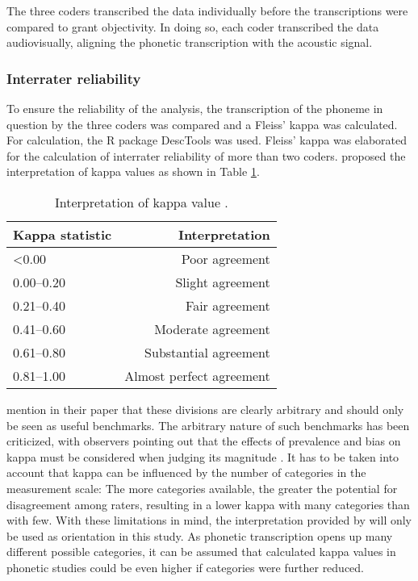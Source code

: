 \documentclass[output=paper]{langscibook}
\begin{document}
The three coders transcribed the data individually before the transcriptions were compared to grant objectivity. In doing so, each coder transcribed the data audiovisually, aligning the phonetic transcription with the acoustic signal. 

\subsubsection{Interrater reliability}
To ensure the reliability of the analysis, the transcription of the phoneme in question by the three coders was compared and a Fleiss' kappa \citep[]{Fleiss2003} was calculated. For calculation, the R package DescTools \citep[]{desc} was used. Fleiss' kappa was elaborated for the calculation of interrater reliability of more than two coders. \citet[]{Landis1977} proposed the interpretation of kappa values as shown in Table \ref{baumler:tab:fleiss}.

\begin{table}
 \begin{tabularx}{.8\textwidth}{Xr}
\midrule\toprule
            Kappa statistic  & Interpretation\\
  \midrule
  <0.00      &   Poor agreement\\
  0.00–0.20  &   Slight agreement\\
  0.21–0.40  &   Fair agreement\\
  0.41–0.60  &   Moderate agreement\\
  0.61–0.80  &   Substantial agreement\\
  0.81–1.00  &   Almost perfect agreement\\
\bottomrule\midrule
 \end{tabularx}
\caption{Interpretation of kappa value \citep[165]{Landis1977}.}
\label{baumler:tab:fleiss}
\end{table}

\citet[]{Landis1977} mention in their paper that these divisions are clearly arbitrary and should only be seen as useful benchmarks. The arbitrary nature of such benchmarks has been criticized, with observers pointing out that the effects of prevalence and bias on kappa must be considered when judging its magnitude \citep[264]{Sim2005}. It has to be taken into account that kappa can be influenced by the number of categories in the measurement scale: The more categories available, the greater the potential for disagreement among raters, resulting in a lower kappa with many categories than with few. With these limitations in mind, the interpretation provided by \citet[]{Landis1977} will only be used as orientation in this study. As phonetic transcription opens up many different possible categories, it can be assumed that calculated kappa values in phonetic studies could be even higher if categories were further reduced.  
\end{document}
